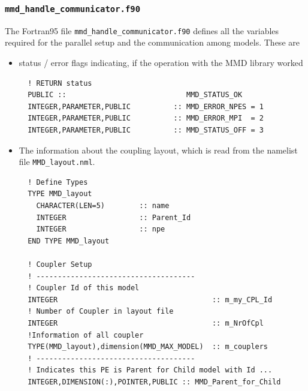 \documentclass[twoside]{article}
\begin{document}
\subsubsection{\tt mmd\_handle\_communicator.f90}\label{sec:handle-comm}
The Fortran95 file \verb|mmd_handle_communicator.f90| defines all the
variables required for the parallel setup and the communication among
models. These are
\begin{itemize}
\item status / error flags indicating, if the operation with the MMD
library worked
\begin{verbatim}
  ! RETURN status
  PUBLIC ::                            MMD_STATUS_OK
  INTEGER,PARAMETER,PUBLIC          :: MMD_ERROR_NPES = 1
  INTEGER,PARAMETER,PUBLIC          :: MMD_ERROR_MPI  = 2
  INTEGER,PARAMETER,PUBLIC          :: MMD_STATUS_OFF = 3 
\end{verbatim}
\item The information about the coupling layout, which is read from
  the namelist file \verb|MMD_layout.nml|.
\begin{verbatim}
  ! Define Types
  TYPE MMD_layout
    CHARACTER(LEN=5)        :: name
    INTEGER                 :: Parent_Id
    INTEGER                 :: npe
  END TYPE MMD_layout

  ! Coupler Setup
  ! -------------------------------------
  ! Coupler Id of this model 
  INTEGER                                    :: m_my_CPL_Id 
  ! Number of Coupler in layout file
  INTEGER                                    :: m_NrOfCpl    
  !Information of all coupler 
  TYPE(MMD_layout),dimension(MMD_MAX_MODEL)  :: m_couplers  
  ! -------------------------------------
  ! Indicates this PE is Parent for Child model with Id ... 
  INTEGER,DIMENSION(:),POINTER,PUBLIC :: MMD_Parent_for_Child


\end{verbatim}
\end{itemize}
\end{document}
